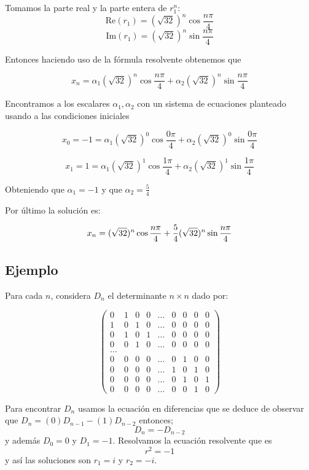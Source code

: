 \documentclass{report}
\begin{document}
Tomamos la parte real y la parte entera de $r_{1}^n$:
$$\mathrm{Re}(r_{1})=(\sqrt{32})^n\cos{\frac{n\pi}{4}}$$  $$\mathrm{Im}(r_{1})=(\sqrt{32})^n\sin{\frac{n\pi}{4}}$$


  Entonces haciendo uso de la fórmula resolvente obtenemos que

  $$x_{n}=\alpha_{1}(\sqrt{32})^n\cos{\frac{n\pi}{4}} + \alpha_{2}(\sqrt{32})^n\sin{\frac{n\pi}{4}}$$

    Encontramos a los escalares $\alpha_1,\alpha_2$ con un sistema de ecuaciones planteado usando a las condiciones iniciales

    $$x_{0}=-1=\alpha_{1}(\sqrt{32})^0\cos{\frac{0\pi}{4}} + \alpha_{2}(\sqrt{32})^0\sin{\frac{0\pi}{4}}$$
      
     $$x_{1}=1=\alpha_{1}(\sqrt{32})^1\cos{\frac{1\pi}{4}} + \alpha_{2}(\sqrt{32})^1\sin{\frac{1\pi}{4}}$$

        Obteniendo que $\alpha_{1}=-1$ y que $\alpha_{2}=\frac{5}{4}$

        Por último la solución
 es:

         $$x_{n}=\-(\sqrt{32})^n\cos{\frac{n\pi}{4}} + \frac{5}{4}(\sqrt{32})^n\sin{\frac{n\pi}{4}}$$


         

\subsection{Ejemplo}

Para cada $n$, considera $D_{n}$ el determinante $n\times n$ dado por:

\begin{equation*}
\begin{pmatrix}
0 & 1 & 0 & 0 &\ldots & 0 & 0 & 0 & 0\\
1 & 0 & 1 & 0 &\ldots & 0 & 0 & 0 & 0\\
0 & 1 & 0 & 1 &\ldots & 0 & 0 & 0 & 0\\
0 & 0 & 1 & 0 &\ldots & 0 & 0 & 0 & 0\\
\ldots\\
0 & 0 & 0 & 0 &\ldots & 0 & 1 & 0 & 0\\
0 & 0 & 0 & 0 &\ldots & 1 & 0 & 1 & 0\\
0 & 0 & 0 & 0 &\ldots & 0 & 1 & 0 & 1\\
0 & 0 & 0 & 0 &\ldots & 0 & 0 & 1 & 0
\end{pmatrix}
\end{equation*}


Para encontrar $D_{n}$ usamos la ecuación en diferencias que se deduce de observar
que $D_{n}=(0)D_{n-1}-(1)D_{n-2}$ entonces;
\begin{equation}
  \label{determinante}
D_{n}=-D_{n-2}
\end{equation}
 y además $D_{0}=0$ y $D_{1}=-1$.
Resolvamos la ecuación resolvente que es $$r^{2}=-1$$ y así las soluciones son $r_{1}=i$ y  $r_{2}=-i$.
\end{document}
